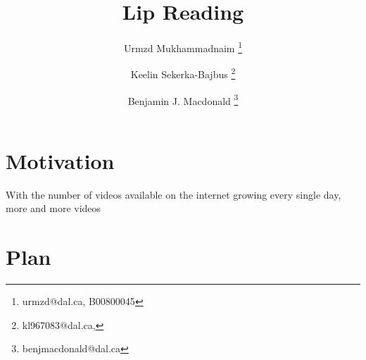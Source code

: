 \documentclass[11pt]{article}
\title{Lip Reading}
\author[1]{Urmzd Mukhammadnaim \thanks{urmzd@dal.ca, B00800045}}
\author[1]{Keelin Sekerka-Bajbus \thanks{kl967083@dal.ca, }}
\author[1]{Benjamin J. Macdonald \thanks{benjmacdonald@dal.ca}}
\affil[1]{Faculty of Computer Science, Dalhousie University}
\begin{document}
\maketitle

\section{Motivation}
With the number of videos available on the internet growing every single day,
more and more videos 



\section{Plan}
\end{document}
